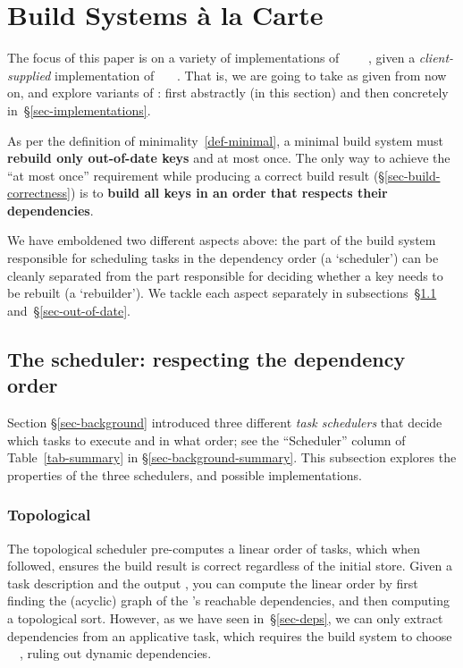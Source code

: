 \section{Build Systems \`a la Carte}\label{sec-build}

The focus of this paper is on a variety of implementations of
~~~~, given
a \emph{client-supplied} implementation of ~~~. That
is, we are going to take  as given from now on, and explore variants of
: first abstractly (in this section) and then concretely
in~\S\ref{sec-implementations}.

As per the definition of minimality~\ref{def-minimal}, a minimal build
system must \textbf{rebuild only out-of-date keys} and at most once. The only
way to achieve the ``at most once'' requirement while producing a correct build
result (\S\ref{sec-build-correctness}) is to \textbf{build all keys in an
order that respects their dependencies}.

\vspace{1mm}
We have emboldened two different aspects above: the part of the
build system responsible for scheduling tasks in the dependency order
(a `scheduler') can be cleanly separated from the part responsible for deciding
whether a key needs to be rebuilt (a `rebuilder'). We tackle each
aspect separately in subsections~\S\ref{sec-dependency-orderings}
and~\S\ref{sec-out-of-date}.

\subsection{The scheduler: respecting the dependency order}
\label{sec-dependency-orderings}

Section \S\ref{sec-background} introduced three different \emph{task schedulers}
that decide which tasks to execute and in what order; see the ``Scheduler'' column
of Table~\ref{tab-summary} in \S\ref{sec-background-summary}.
This subsection explores the properties of the three schedulers, and
possible implementations.

\vspace{-2mm}
\subsubsection{Topological}\label{sec-topological}

The topological scheduler pre-computes a linear order of tasks, which when followed,
ensures the build result is correct regardless of the initial store. Given a
task description and the output , you can compute the linear order by
first finding the (acyclic) graph of the 's reachable dependencies, and
then computing a topological sort. However, as we have seen in~\S\ref{sec-deps},
we can only extract dependencies from an applicative task, which requires the
build system to choose ~\hs{=}~, ruling out dynamic
dependencies.

